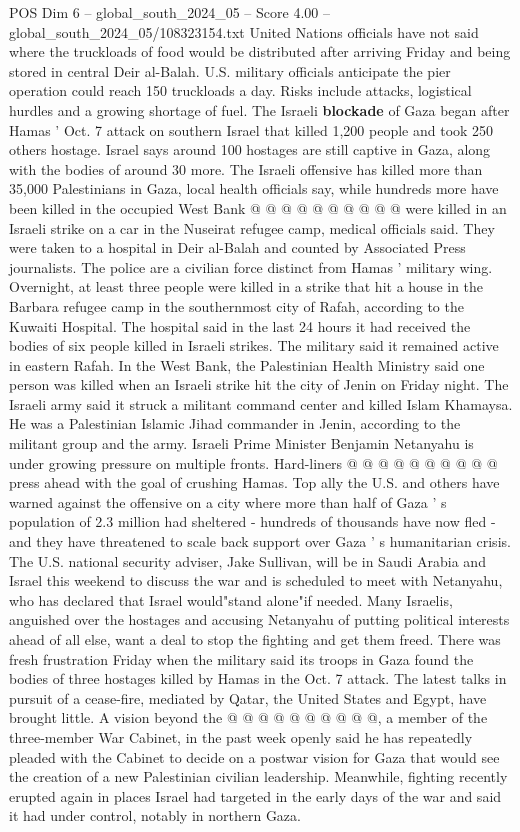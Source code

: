 \begin{textsample}{POS Dim 6 – global\_south\_2024\_05 – Score 4.00 – global\_south\_2024\_05/108323154.txt}
United Nations officials have not said where the truckloads of food would be distributed after arriving Friday and being stored in central Deir al-Balah.
U.S. military officials anticipate the pier operation could reach 150 truckloads a day.
Risks include attacks, logistical hurdles and a growing shortage of fuel.
The Israeli \textbf{blockade} of Gaza began after Hamas ' Oct. 7 attack on southern Israel that killed 1,200 people and took 250 others hostage.
Israel says around 100 hostages are still captive in Gaza, along with the bodies of around 30 more.
The Israeli offensive has killed more than 35,000 Palestinians in Gaza, local health officials say, while hundreds more have been killed in the occupied West Bank @ @ @ @ @ @ @ @ @ @ were killed in an Israeli strike on a car in the Nuseirat refugee camp, medical officials said.
They were taken to a hospital in Deir al-Balah and counted by Associated Press journalists.
The police are a civilian force distinct from Hamas ' military wing.
Overnight, at least three people were killed in a strike that hit a house in the Barbara refugee camp in the southernmost city of Rafah, according to the Kuwaiti Hospital.
The hospital said in the last 24 hours it had received the bodies of six people killed in Israeli strikes.
The military said it remained active in eastern Rafah.
In the West Bank, the Palestinian Health Ministry said one person was killed when an Israeli strike hit the city of Jenin on Friday night.
The Israeli army said it struck a militant command center and killed Islam Khamaysa.
He was a Palestinian Islamic Jihad commander in Jenin, according to the militant group and the army.
Israeli Prime Minister Benjamin Netanyahu is under growing pressure on multiple fronts.
Hard-liners @ @ @ @ @ @ @ @ @ @ press ahead with the goal of crushing Hamas.
Top ally the U.S. and others have warned against the offensive on a city where more than half of Gaza ' s population of 2.3 million had sheltered - hundreds of thousands have now fled - and they have threatened to scale back support over Gaza ' s humanitarian crisis.
The U.S. national security adviser, Jake Sullivan, will be in Saudi Arabia and Israel this weekend to discuss the war and is scheduled to meet with Netanyahu, who has declared that Israel would"stand alone"if needed.
Many Israelis, anguished over the hostages and accusing Netanyahu of putting political interests ahead of all else, want a deal to stop the fighting and get them freed.
There was fresh frustration Friday when the military said its troops in Gaza found the bodies of three hostages killed by Hamas in the Oct. 7 attack.
The latest talks in pursuit of a cease-fire, mediated by Qatar, the United States and Egypt, have brought little.
A vision beyond the @ @ @ @ @ @ @ @ @ @, a member of the three-member War Cabinet, in the past week openly said he has repeatedly pleaded with the Cabinet to decide on a postwar vision for Gaza that would see the creation of a new Palestinian civilian leadership.
Meanwhile, fighting recently erupted again in places Israel had targeted in the early days of the war and said it had under control, notably in northern Gaza.

\end{textsample}
